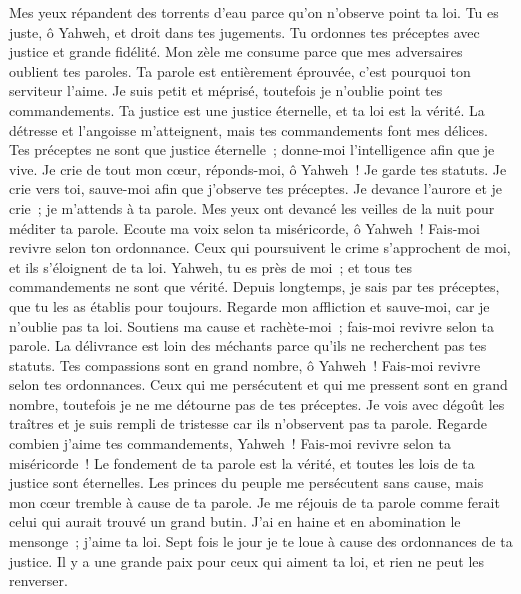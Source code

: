 \begin{multicols}{2}
Mes yeux répandent des torrents d'eau parce qu'on n'observe point ta loi.
 Tu es juste, ô Yahweh, et droit dans tes jugements.
Tu ordonnes tes préceptes avec justice et grande fidélité.
Mon zèle me consume parce que mes adversaires oublient tes paroles.
Ta parole est entièrement éprouvée, c'est pourquoi ton serviteur l'aime.
Je suis petit et méprisé, toutefois je n'oublie point tes commandements.
Ta justice est une justice éternelle, et ta loi est la vérité.
La détresse et l'angoisse m'atteignent, mais tes commandements font mes délices.
Tes préceptes ne sont que justice éternelle~; donne-moi l'intelligence afin que je vive.
 Je crie de tout mon cœur, réponds-moi, ô Yahweh~! Je garde tes statuts.
Je crie vers toi, sauve-moi afin que j'observe tes préceptes.
Je devance l'aurore et je crie~; je m'attends à ta parole.
Mes yeux ont devancé les veilles de la nuit pour méditer ta parole.
Ecoute ma voix selon ta miséricorde, ô Yahweh~! Fais-moi revivre selon ton ordonnance.
Ceux qui poursuivent le crime s'approchent de moi, et ils s'éloignent de ta loi.
Yahweh, tu es près de moi~; et tous tes commandements ne sont que vérité.
Depuis longtemps, je sais par tes préceptes, que tu les as établis pour toujours.
 Regarde mon affliction et sauve-moi, car je n'oublie pas ta loi.
Soutiens ma cause et rachète-moi~; fais-moi revivre selon ta parole.
La délivrance est loin des méchants parce qu'ils ne recherchent pas tes statuts.
Tes compassions sont en grand nombre, ô Yahweh~! Fais-moi revivre selon tes ordonnances.
Ceux qui me persécutent et qui me pressent sont en grand nombre, toutefois je ne me détourne pas de tes préceptes.
Je vois avec dégoût les traîtres et je suis rempli de tristesse car ils n'observent pas ta parole.
Regarde combien j'aime tes commandements, Yahweh~! Fais-moi revivre selon ta miséricorde~!
Le fondement de ta parole est la vérité, et toutes les lois de ta justice sont éternelles.
 Les princes du peuple me persécutent sans cause, mais mon cœur tremble à cause de ta parole.
Je me réjouis de ta parole comme ferait celui qui aurait trouvé un grand butin.
J'ai en haine et en abomination le mensonge~; j'aime ta loi.
Sept fois le jour je te loue à cause des ordonnances de ta justice.
Il y a une grande paix pour ceux qui aiment ta loi, et rien ne peut les renverser.

\end{multicols}
